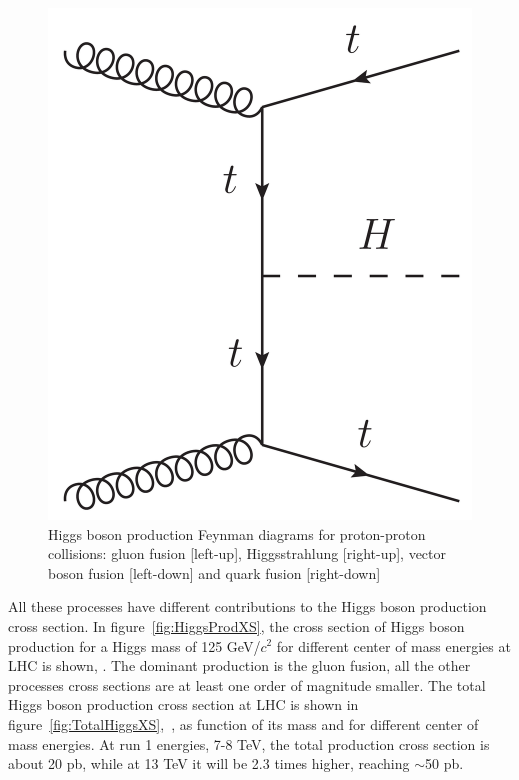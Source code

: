 \begin{figure}[!Hhtbp]
\begin{center}
    \includegraphics[scale=0.45]{figs/QuarkF_H.png}
    \caption{Higgs boson production Feynman diagrams for proton-proton collisions: gluon fusion [left-up], Higgsstrahlung [right-up], vector boson fusion [left-down] and quark fusion [right-down]}
    \label{fig:HiggsProd}
  \end{center}
\end{figure}

All these processes have different contributions to the Higgs boson production cross section. In figure~\ref{fig:HiggsProdXS}, the cross section of Higgs boson production for a Higgs mass of 125 GeV/$c^{2}$ for different center of mass energies at LHC is shown, \cite{HIGGSXSWG}. The dominant production is the gluon fusion, all the other processes cross sections are at least one order of magnitude smaller. The total Higgs boson production cross section at LHC is shown in figure~\ref{fig:TotalHiggsXS},~\cite{Dittmaier:2011ti, Dittmaier:2012vm, Heinemeyer:2013tqa, HIGGSXSWG}, as function of its mass and for different center of mass energies. At run 1 energies, 7-8 TeV, the total production cross section is about 20 pb, while at 13 TeV it will be 2.3 times higher, reaching $\sim$50 pb. 


